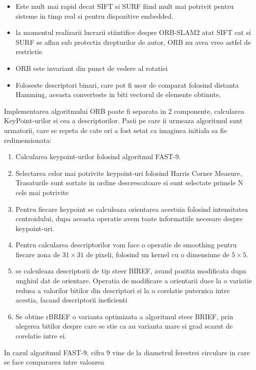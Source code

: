 \documentclass[12pt,a4paper]{report}
\begin{document}
\begin{itemize}
    \item Este mult mai rapid decat SIFT si SURF fiind mult mai potrivit pentru sisteme
in timp real si pentru dispozitive embedded.
    \item la momentul realizarii lucrarii stiintifice despre ORB-SLAM2 atat SIFT cat 
si SURF se aflau sub protectia drepturilor de autor, ORB nu avea vreo astfel de restrictie
    \item ORB este invariant din punct de vedere al rotatiei   
    \item Foloseste descriptori binari, care pot fi usor de comparat folosind distanta Hamming,
    aceasta converteste in biti vectorul de elemente obtinute, 
\end{itemize}
Implementarea algoritmului ORB poate fi separata in 2 componente, calcularea KeyPoint-urilor si 
cea a descriptorilor. Pasii pe care ii urmeaza algoritmul sunt urmatorii, care se repeta 
de cate ori a fost setat ca imaginea initiala sa fie redimensionata:
\begin{enumerate}
    \item Calcularea keypoint-urilor folosind algoritmul FAST-9.
    \item Selectarea celor mai potrivite keypoint-uri folosind Harris Corner Measure, Trasaturile
sunt sortate in ordine descrescatoare si sunt selectate primele N cele mai potrivite
    \item Pentru fiecare keypoint se calculeaza orientarea acestuia folosind intensitatea
centroidului, dupa aceasta operatie avem toate informatiile necesare despre keypoint-uri.
    \item Pentru calcularea descriptorilor vom face o operatie de smoothing pentru fiecare 
zona de $ 31 \times 31 $ de pixeli, folosind un kernel cu o dimensiune de $ 5 \times 5 $.
    \item se calculeaza descriptorii de tip steer BIREF, avand pozitia modificata dupa unghiul
dat de orientare. Operatia de modificare a orientarii duce la o variatie redusa a valorilor 
bitilor din descriptori si la o corelatie puternica intre acestia, facand descriptorii ineficienti
    \item Se obtine rBRIEF o varianta optimizata a algoritmul steer BRIEF, prin alegerea bitilor
despre care se stie ca au varianta mare si grad scazut de corelatie intre ei.
\end{enumerate}   
In cazul algoritmul FAST-9, 
cifra 9 vine de la diametrul ferestrei circulare in care se face compararea intre valoarea 
\end{document}
